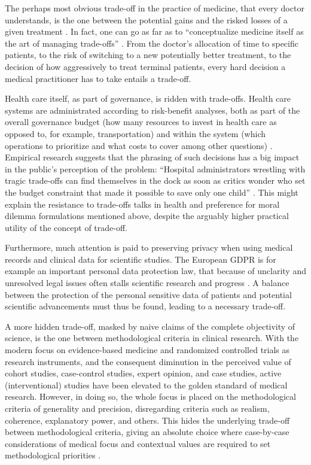     The perhaps most obvious trade-off in the practice of medicine, that every doctor understands, is the one between the potential gains and the risked losses of a given treatment \cite{Launer2020}.
    In fact, one can go as far as to ``conceptualize medicine itself as the art of managing trade-offs'' \cite[p.~575]{Launer2020}.
    From the doctor's allocation of time to specific patients, to the risk of switching to a new potentially better treatment, to the decision of how aggressively to treat terminal patients, every hard decision a medical practitioner has to take entails a trade-off.

    Health care itself, as part of governance, is ridden with trade-offs.
    Health care systems are administrated according to risk-benefit analyses, both as part of the overall governance budget (how many resources to invest in health care as opposed to, for example, transportation) and within the system (which operations to prioritize and what costs to cover among other questions) \cite{Dionne2018}.
    Empirical research suggests that the phrasing of such decisions has a big impact in the public's perception of the problem:
    ``Hospital administrators wrestling with tragic trade-offs can find themselves in the dock as soon as critics wonder who set the budget constraint that made it possible to save only one child'' \cite[p.~323]{Tetlock2003}.
    This might explain the resistance to trade-offs talks in health and preference for moral dilemma formulations mentioned above, despite the arguably higher practical utility of the concept of trade-off.

    Furthermore, much attention is paid to preserving privacy when using medical records and clinical data for scientific studies.
    The European GDPR is for example an important personal data protection law, that because of unclarity and unresolved legal issues often stalls scientific research and progress \cite{Eiss2020}.
    A balance between the protection of the personal sensitive data of patients and potential scientific advancements must thus be found, leading to a necessary trade-off.

    A more hidden trade-off, masked by naive claims of the complete objectivity of science, is the one between methodological criteria in clinical research.
    With the modern focus on evidence-based medicine and randomized controlled trials as research instruments, and the consequent diminution in the perceived value of cohort studies, case-control studies, expert opinion, and case studies, active (interventional) studies have been elevated to the golden standard of medical research.
    However, in doing so, the whole focus is placed on the methodological criteria of generality and precision, disregarding criteria such as realism, coherence, explanatory power, and others.
    This hides the underlying trade-off between methodological criteria, giving an absolute choice where case-by-case considerations of medical focus and contextual values are required to set methodological priorities \cite{Ho2011}.

